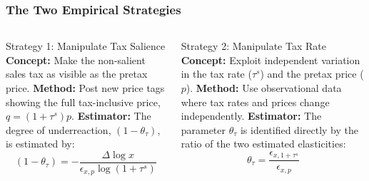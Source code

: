 \documentclass{beamer}
\begin{document}
\begin{frame}
\frametitle{The Two Empirical Strategies}

\begin{columns}[T] %
\begin{column}{0.5\textwidth}
\begin{alertblock}{Strategy 1: Manipulate Tax Salience}
    \textbf{Concept:} Make the non-salient sales tax as visible as the pretax price.
    \vspace{0.5em}
    \textbf{Method:} Post new price tags showing the full tax-inclusive price, $q=(1+\tau^s)p$.
    \vspace{0.5em}
    \textbf{Estimator:} The degree of underreaction, $(1-\theta_{\tau})$, is estimated by:
    \[ (1 - \theta_{\tau}) = - \frac{\Delta \log x}{\epsilon_{x,p} \log(1+\tau^s)} \]
\end{alertblock}
\end{column}

\begin{column}{0.5\textwidth}
\begin{exampleblock}{Strategy 2: Manipulate Tax Rate}
    \textbf{Concept:} Exploit independent variation in the tax rate ($\tau^s$) and the pretax price ($p$).
    \vspace{0.5em}
    \textbf{Method:} Use observational data where tax rates and prices change independently.
    \vspace{0.5em}
    \textbf{Estimator:} The parameter $\theta_{\tau}$ is identified directly by the ratio of the two estimated elasticities:
    \[ \theta_{\tau} = \frac{\epsilon_{x,1+\tau^s}}{\epsilon_{x,p}} \]
\end{exampleblock}
\end{column}
\end{columns}

\begin{center}
\end{center}

\end{frame}
\end{document}
